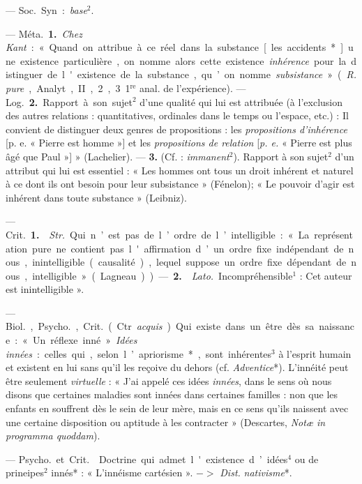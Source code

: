 \begin{itemize}[leftmargin=1cm, label=, itemsep=1pt]
 — \si{Soc.} Syn. : {\it base}$^2$.

 — \si{Méta.} {\bf 1.} {\it Chez Kant} : « Quand on attribue à
ce réel dans la substance [les accidents*] une existence particulière, on
nomme alors cette existence {\it inhérence} pour la distinguer de l'existence
de la substance, qu’on nomme {\it subsistance} » ({\it R. pure}, Analyt., II,
2, 3 1$^\text{re}$ anal. de l'expérience). — \si{Log.}  {\bf 2.} Rapport à
son sujet$^2$ d’une qualité qui lui est attribuée (à l’exclusion des autres
relations : quantitatives, ordinales dans le temps ou l’espace, etc.) : Il
convient de distinguer deux genres de propositions : les {\it propositions
d’inhérence} [p. e. « Pierre est homme »] et les {\it propositions de
relation} [{\it p. e.} « Pierre est plus âgé que Paul »] » (Lachelier). —
{\bf 3.} (Cf. :
{\it immanent}$^2$). Rapport à son sujet$^2$ d'un attribut qui lui est
essentiel : « Les hommes ont tous un droit inhérent et naturel à ce dont ils
ont besoin pour leur subsistance » (Fénelon); « Le pouvoir d'agir est
inhérent dans toute substance » (Leibniz).

 — \si{Crit.} {\bf 1.}  {\it Str.} Qui
n’est pas de l’ordre de l’intelligible : « La représentation pure ne contient
pas l'affirmation d’un ordre fixe indépendant de nous, inintelligible
(causalité), lequel suppose un ordre fixe dépendant de nous,
intelligible » (Lagneau)). — {\bf 2.}  {\it Lato.}
Incompréhensible$^1$ : Cet auteur est inintelligible ».

 — \si{Biol.}, \si{Psycho.}, \si{Crit.} (Ctr. {\it acquis}). Qui
existe dans un être dès sa naissance : « Un réflexe inné ». {\it Idées
innées} : celles qui, selon l’apriorisme*, sont inhérentes$^3$ à l'esprit
humain et existent en lui sans qu'il les reçoive du dehors (cf.
{\it Adventice}*). L’innéité peut être seulement {\it virtuelle} : « J'ai
appelé ces idées {\it innées}, dans le sens où nous disons que certaines
maladies sont innées dans certaines familles : non que les enfants en
souffrent dès le sein de leur mère, mais en ce sens qu'ils naissent avec une
certaine disposition ou aptitude à les contracter » (Descartes, {\it Notæ in
programma quoddam}).

 — \si{Psycho.} et \si{Crit.}  Doctrine qui admet
l'existence d’idées$^4$ ou de prineipes$^2$ innés* : « L’innéisme
cartésien ». $->$ {\it Dist.} {\it nativisme}*.


\end{itemize}
